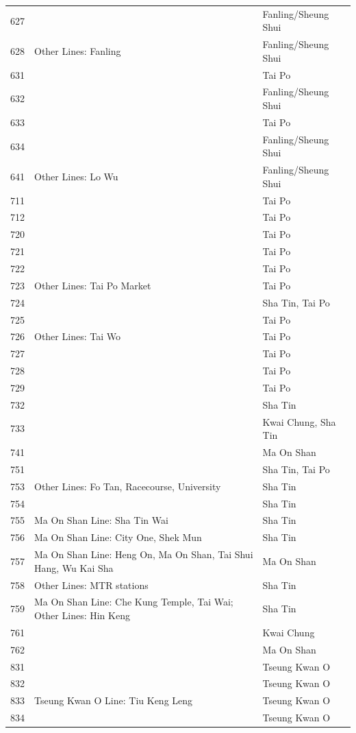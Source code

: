 \begin{longtable}{p{1.5cm}p{8cm}p{4cm}}
627 &  & Fanling/Sheung Shui \\
628 & Other Lines: Fanling & Fanling/Sheung Shui \\
631 &  & Tai Po \\
632 &  & Fanling/Sheung Shui \\
633 &  & Tai Po \\
634 &  & Fanling/Sheung Shui \\
641 & Other Lines: Lo Wu & Fanling/Sheung Shui \\
711 &  & Tai Po \\
712 &  & Tai Po \\
720 &  & Tai Po \\
721 &  & Tai Po \\
722 &  & Tai Po \\
723 & Other Lines: Tai Po Market & Tai Po \\
724 &  & Sha Tin, Tai Po \\
725 &  & Tai Po \\
726 & Other Lines: Tai Wo & Tai Po \\
727 &  & Tai Po \\
728 &  & Tai Po \\
729 &  & Tai Po \\
732 &  & Sha Tin \\
733 &  & Kwai Chung, Sha Tin \\
741 &  & Ma On Shan \\
751 &  & Sha Tin, Tai Po \\
753 & Other Lines: Fo Tan, Racecourse, University & Sha Tin \\
754 &  & Sha Tin \\
755 & Ma On Shan Line: Sha Tin Wai & Sha Tin \\
756 & Ma On Shan Line: City One, Shek Mun & Sha Tin \\
757 & Ma On Shan Line: Heng On, Ma On Shan, Tai Shui Hang, Wu Kai Sha & Ma On Shan \\
758 & Other Lines: MTR stations & Sha Tin \\
759 & Ma On Shan Line: Che Kung Temple, Tai Wai; Other Lines: Hin Keng & Sha Tin \\
761 &  & Kwai Chung \\
762 &  & Ma On Shan \\
831 &  & Tseung Kwan O \\
832 &  & Tseung Kwan O \\
833 & Tseung Kwan O Line: Tiu Keng Leng & Tseung Kwan O \\
834 &  & Tseung Kwan O \\

\end{longtable}
